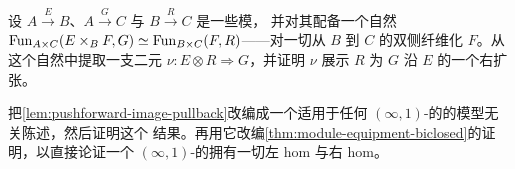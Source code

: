 \begin{exercise}\label{ex:module-cell-right-extension}
设 $A\xrightarrow{E}B$、$A\xrightarrow{G}C$ 与 $B\xrightarrow{R}C$ 是一些模，
并对其配备一个自然\trEquivalence{}
$\operatorname{Fun}_{A\times C}(E\times_{B}F,G)\simeq\operatorname{Fun}_{B\times C}(F,R)$——对一切从 $B$
到 $C$ 的双侧纤维化 $F$。从这个自然\trEquivalence{}中提取一支二元\trCell{}
$\nu\colon E\otimes R\Rightarrow G$，并证明 $\nu$ 展示 $R$ 为 $G$ 沿
$E$ 的一个右扩张。
\end{exercise}

\begin{exercise}\label{ex:model-independent-lemma-12-3-7}
把\cref{lem:pushforward-image-pullback}改编成一个适用于任何
$(\infty,1)$-\trCategory{}的\trInfinityCosmos{}的模型无关陈述，然后证明这个
结果。再用它改编\cref{thm:module-equipment-biclosed}的证明，以直接论证一个
$(\infty,1)$-\trCategory{}的\trInfinityCosmos{}拥有一切左 hom 与右 hom。
\end{exercise}








